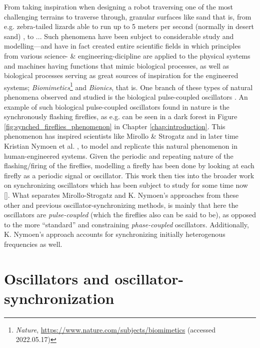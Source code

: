 From taking inspiration when designing a robot traversing one of the most challenging terrains to traverse through, granular surfaces like sand that is, from e.g. zebra-tailed lizards able to run up to 5 meters per second (normally in desert sand) \cite{sandbots}, to ... Such phenomena have been subject to considerable study and modelling—and have in fact created entire scientific fields in which principles from various science- \& engineering-dicipline are applied to the physical systems and machines having functions that mimic biological processes, as well as biological processes serving as great sources of inspiration for the engineered systems; \textit{Biomimetics}\footnote{\textit{Nature}, \url{https://www.nature.com/subjects/biomimetics} (accessed 2022.05.17)} and \textit{Bionics}, that is. One branch of these types of natural phenomena observed and studied is the biological pulse-coupled oscillators \cite{russerMinimalAssumptionsReferanser}. An example of such biological pulse-coupled oscillators found in nature is the synchronously flashing fireflies, as e.g. can be seen in a dark forest in Figure \ref{fig:synched_fireflies_phenomenon} in Chapter \ref{chap:introduction}. This phenomenon has inspired scientists like Mirollo \& Strogatz \cite{mirollo_strogatz_PCO_synch} and in later time Kristian Nymoen et al. \cite{nymoen_synch}, to model and replicate this natural phenomenon in human-engineered systems. Given the periodic and repeating nature of the flashing/firing of the fireflies, modelling a firefly has been done by looking at each firefly as a periodic signal or oscillator. This work \cite{mirollo_strogatz_PCO_synch, nymoen_synch} then ties into the broader work on synchronizing oscillators which has been subject to study for some time now []. What separates Mirollo-Strogatz and K. Nymoen's approaches from these other and previous oscillator-synchronizing methods, is mainly that here the oscillators are \textit{pulse-coupled} (which the fireflies also can be said to be), as opposed to the more ``standard'' and constraining \textit{phase-coupled} oscillators. Additionally, K. Nymoen's approach accounts for synchronizing initially heterogenous frequencies as well.




\section{Oscillators and oscillator-synchronization}



